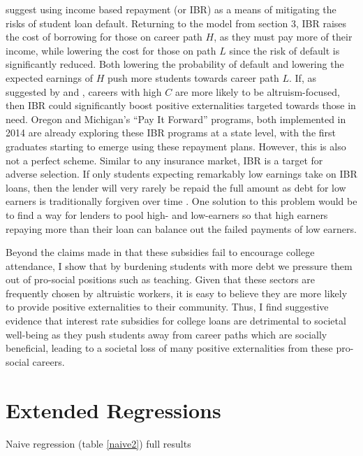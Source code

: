 \documentclass[12pt]{article}
\newcommand{\regs}{../Analysis/Regressions/Output/}
\begin{document}
	\textcite{abraham2018} suggest using income based repayment (or IBR) as a means of mitigating the risks of student loan default. Returning to the model from section 3, IBR raises the cost of borrowing for those on career path $H$, as they must pay more of their income, while lowering the cost for those on path $L$ since the risk of default is significantly reduced. Both lowering the probability of default and lowering the expected earnings of $H$ push more students towards career path $L$. If, as suggested by \textcite{benshem1991} and \textcite{hanson1995}, careers with high $C$ are more likely to be altruism-focused, then IBR could significantly boost positive externalities targeted towards those in need.  Oregon and Michigan's ``Pay It Forward'' programs, both implemented in 2014 are already exploring these IBR programs at a state level, with the first graduates starting to emerge using these repayment plans. However, this is also not a perfect scheme. Similar to any insurance market, IBR is a target for adverse selection. If only students expecting remarkably low earnings take on IBR loans, then the lender will very rarely be repaid the full amount as debt for low earners is traditionally forgiven over time \parencite{dynarski2015}. One solution to this problem would be to find a way for lenders to pool high- and low-earners so that high earners repaying more than their loan can balance out the failed payments of low earners.
	
	Beyond the claims made in  \textcite{dynarski2015} that these subsidies fail to encourage college attendance, I show that by burdening students with more debt we pressure them out of pro-social positions such as teaching. Given that these sectors are frequently chosen by altruistic workers, it is easy to believe they are more likely to provide positive externalities to their community. Thus, I find suggestive evidence that interest rate subsidies for college loans are detrimental to societal well-being as they push students away from career paths which are socially beneficial, leading to a societal loss of many positive externalities from these pro-social careers.
	
	
	
	
	\clearpage
	\appendix
	\section{Extended Regressions}
	
	\begin{table}
		\centering
		\caption{Naive regression (table \ref{naive2}) full results}
		\resizebox{\textwidth}{!}{
			
		}
		\label{naivefull}
	\end{table}
\end{document}
